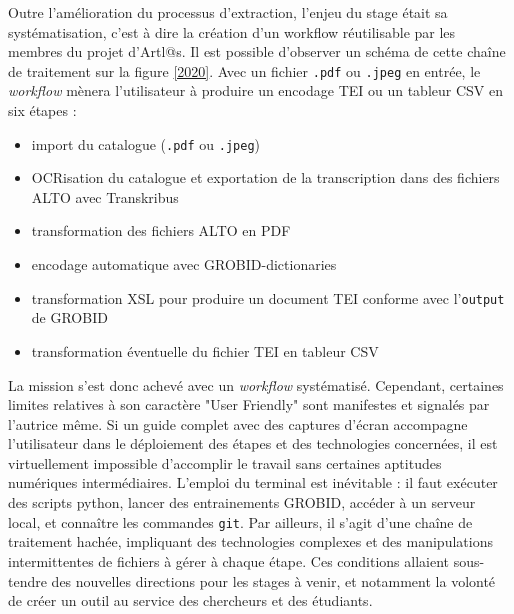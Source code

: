 \documentclass[a4paper,12pt,twoside]{book}
\begin{document}
Outre l'amélioration du processus d'extraction, l'enjeu du stage était sa systématisation, c'est à dire la création d'un workflow réutilisable par les membres du projet d’Artl@s. Il est possible d'observer un schéma de cette chaîne de traitement sur la figure \ref{2020}. Avec un fichier \texttt{.pdf} ou \texttt{.jpeg} en entrée, le \textit{workflow} mènera l'utilisateur à produire un encodage TEI ou un tableur CSV en six étapes :
\begin{itemize}
	\item import du catalogue (\texttt{.pdf} ou \texttt{.jpeg})
	\item OCRisation du catalogue et exportation de la transcription dans des fichiers ALTO avec Transkribus
	\item transformation des fichiers ALTO en PDF
	\item encodage automatique avec GROBID-dictionaries
	\item transformation XSL pour produire un document TEI conforme avec l'\texttt{output} de GROBID
	\item transformation éventuelle du fichier TEI en tableur CSV
\end{itemize}
La mission s'est donc achevé avec un \textit{workflow} systématisé. Cependant, certaines limites relatives à son caractère "User Friendly" sont manifestes et signalés par l'autrice même. Si un guide complet avec des captures d'écran accompagne l'utilisateur dans le déploiement des étapes et des technologies concernées, il est virtuellement impossible d'accomplir le travail sans certaines aptitudes numériques intermédiaires. L'emploi du terminal est inévitable : il faut exécuter des scripts python, lancer des entrainements GROBID, accéder à un serveur local, et connaître les commandes \texttt{git}. Par ailleurs, il s'agit d'une chaîne de traitement hachée, impliquant des technologies complexes et des manipulations intermittentes de fichiers à gérer à chaque étape. Ces conditions allaient sous-tendre des nouvelles directions pour les stages à venir, et notamment la volonté de créer un outil au service des chercheurs et des étudiants.
\end{document}
